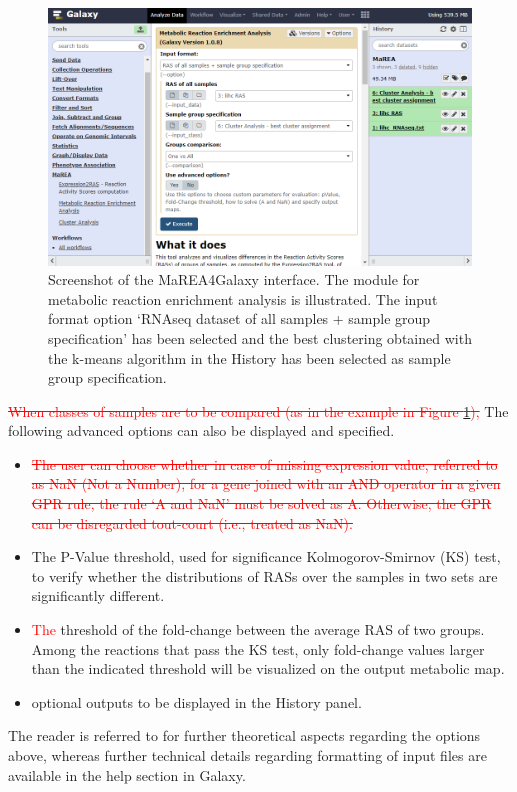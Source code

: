 \documentclass[preprint,12pt,authoryear]{elsarticle}
\newcommand{\red}{\textcolor{red}}
\newcommand{\mareagalaxy}{\textsf{MaREA4Galaxy}}
\begin{document}
\begin{figure}[ht]
  \includegraphics[width=1\textwidth]{figs/screenshot3v2q.png}
  \caption{Screenshot of the \mareagalaxy{} interface. The module for
    metabolic reaction enrichment analysis is illustrated. The input
    format option `RNAseq dataset of all samples + sample group
    specification' has been selected and the best clustering obtained
    with the k-means algorithm in the History has been selected as
    sample group specification.}
  \label{fig:screenshot3}
\end{figure}

\red{\sout{When classes of samples are to be compared (as in the
    example in Figure \ref{fig:screenshot3}),}} The following advanced
options can also be displayed and specified.
\begin{itemize}
\item \red{\sout{ The user can choose whether in case of missing
      expression value, referred to as NaN (Not a Number), for a gene
      joined with an AND operator in a given GPR rule, the rule `A and
      NaN' must be solved as A. Otherwise, the GPR can be disregarded
      tout-court (i.e., treated as NaN).}}
  
\item The P-Value threshold, used for significance Kolmogorov-Smirnov
  (KS) test, to verify whether the distributions of RASs over the
  samples in two sets are significantly different.
  
\item \red{The} threshold of the fold-change between the average RAS of two
  groups. Among the reactions that pass the KS test,  only fold-change
  values larger than the indicated threshold will be visualized on the
  output metabolic map.
  
\item optional outputs to be displayed in the History panel.
\end{itemize}
%
The reader is referred to \citep{marea} for further theoretical
aspects regarding the options above, whereas further technical details
regarding formatting of input files are available in the help section
in Galaxy.
\end{document}

